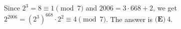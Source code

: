 Since $2^3=8\equiv1\pmod7$ and $2006=3\cdot668+2$, we get $2^{2006}=(2^3)^{668}\cdot2^2\equiv4\pmod7$. The answer is $\boxed{\textbf{(E)}\ 4}$.
